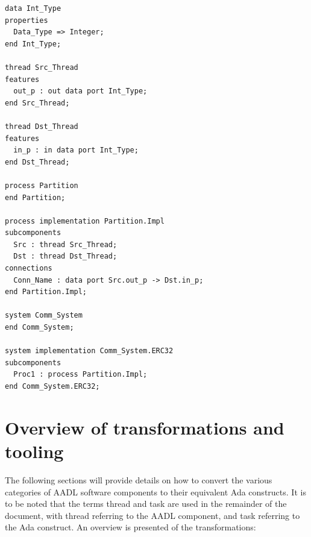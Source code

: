 \begin{minipage}[htbp]{\listingwidth}
\lstset{language=aadl}
\begin{lstlisting}[label=lst:aadl_ex, caption=AADL source for
    specification which contains the system implementation shown in
    Fig.~\ref{fig:aadl_ex}]
data Int_Type
properties
  Data_Type => Integer;
end Int_Type;

thread Src_Thread
features
  out_p : out data port Int_Type;
end Src_Thread;

thread Dst_Thread
features
  in_p : in data port Int_Type;
end Dst_Thread;

process Partition
end Partition;

process implementation Partition.Impl
subcomponents
  Src : thread Src_Thread;
  Dst : thread Dst_Thread;
connections
  Conn_Name : data port Src.out_p -> Dst.in_p;
end Partition.Impl;

system Comm_System
end Comm_System;

system implementation Comm_System.ERC32
subcomponents
  Proc1 : process Partition.Impl;
end Comm_System.ERC32;
\end{lstlisting}
\end{minipage}

\section{Overview of transformations and tooling}
The following sections will provide details on how to convert the
various categories of AADL software components to their equivalent Ada
constructs. It is to be noted that the terms thread and task are used
in the remainder of the document, with thread referring to the AADL
component, and task referring to the Ada construct. An overview is
presented of the transformations:

